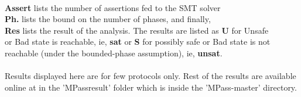 \\\hspace*{5mm}{\bf Column} {\bf Assert} lists the number of assertions fed to the SMT solver
\\\hspace*{5mm}{\bf Column} {\bf Ph.} lists the bound on the number of phases, and finally,
\\\hspace*{5mm}{\bf Column} {\bf Res} lists the result of the analysis. The results are listed as {\bf U} for Unsafe
\\\hspace*{5mm}or Bad state is reachable, ie, {\bf sat} or {\bf S} for possibly safe or Bad state is not
\\\hspace*{5mm}reachable (under the bounded-phase assumption), ie, {\bf unsat}.
\\\\
Results displayed here are for few protocols only. Rest of the results are available online at \cite{github.MPass} 
in the 'MPass\textunderscore result' folder which is inside the 'MPass-master' directory.



